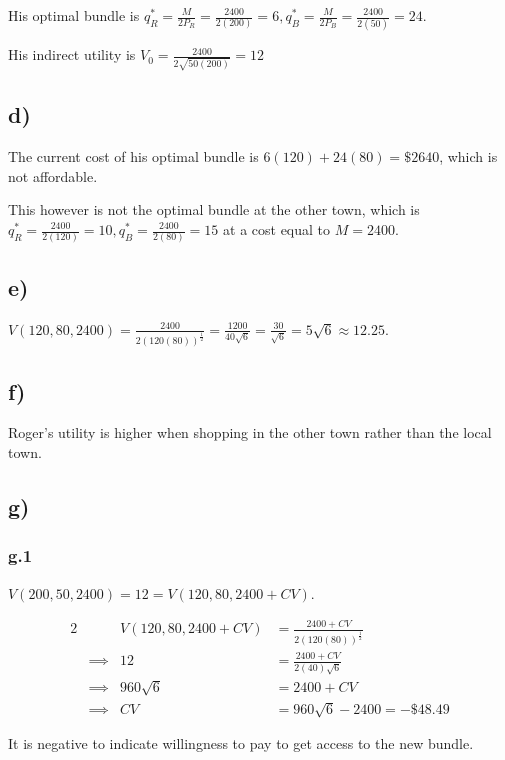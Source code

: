 \documentclass[12pt,letterpaper]{article}
\theoremstyle{definition}
\begin{document}
His optimal bundle is $q_R^* = \frac{M}{2P_R} = \frac{2400}{2(200)} = 6, q_B^* =
\frac{M}{2P_B} = \frac{2400}{2(50)} = 24$.

His indirect utility is $V_0 = \frac{2400}{2\sqrt{50(200)}} = 12$

\subsection*{d)}

The current cost of his optimal bundle is $6(120) + 24(80) = \$2640$, which is
not affordable.

This however is not the optimal bundle at the other town, which is $q_R^* =
\frac{2400}{2(120)} = 10, q_B^* = \frac{2400}{2(80)} = 15$ at a cost equal to $M
= 2400$.

\subsection*{e)}

$V(120,80,2400) = \frac{2400}{2(120(80))^{\frac{1}{2}}} =
\frac{1200}{40\sqrt{6}} =\frac{30}{\sqrt{6}} = 5\sqrt{6} \approx 12.25$.

\subsection*{f)}

Roger's utility is higher when shopping in the other town rather than the local town.

\subsection*{g)}

\subsubsection*{g.1}

$V(200,50,2400) = 12 = V(120,80,2400+CV)$.

\begin{alignat*}{2}
  && V(120,80,2400+CV) &= \frac{2400 + CV}{2(120(80))^{\frac{1}{2}}} \\
  &\implies& 12 &= \frac{2400 + CV}{2(40)\sqrt{6}} \\
  &\implies& 960\sqrt{6} &= 2400 + CV \\
  &\implies& CV &= 960\sqrt{6} - 2400 = -\$48.49
\end{alignat*}

It is negative to indicate willingness to pay to get access to the new bundle.
\end{document}
